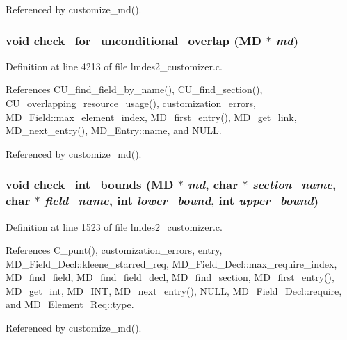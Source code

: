 Referenced by customize\_\-md().
\subsubsection{\setlength{\rightskip}{0pt plus 5cm}void check\_\-for\_\-unconditional\_\-overlap (\bf{MD} $\ast$ {\em md})}\label{lmdes2__customizer_8c_2fcefe048bbfcd44785ed45ad58bde9d}




Definition at line 4213 of file lmdes2\_\-customizer.c.

References CU\_\-find\_\-field\_\-by\_\-name(), CU\_\-find\_\-section(), CU\_\-overlapping\_\-resource\_\-usage(), customization\_\-errors, MD\_\-Field::max\_\-element\_\-index, MD\_\-first\_\-entry(), MD\_\-get\_\-link, MD\_\-next\_\-entry(), MD\_\-Entry::name, and NULL.

Referenced by customize\_\-md().
\subsubsection{\setlength{\rightskip}{0pt plus 5cm}void check\_\-int\_\-bounds (\bf{MD} $\ast$ {\em md}, char $\ast$ {\em section\_\-name}, char $\ast$ {\em field\_\-name}, int {\em lower\_\-bound}, int {\em upper\_\-bound})}\label{lmdes2__customizer_8c_41d1d44089b9ab6bbc29aa96db125b25}




Definition at line 1523 of file lmdes2\_\-customizer.c.

References C\_\-punt(), customization\_\-errors, entry, MD\_\-Field\_\-Decl::kleene\_\-starred\_\-req, MD\_\-Field\_\-Decl::max\_\-require\_\-index, MD\_\-find\_\-field, MD\_\-find\_\-field\_\-decl, MD\_\-find\_\-section, MD\_\-first\_\-entry(), MD\_\-get\_\-int, MD\_\-INT, MD\_\-next\_\-entry(), NULL, MD\_\-Field\_\-Decl::require, and MD\_\-Element\_\-Req::type.

Referenced by customize\_\-md().
